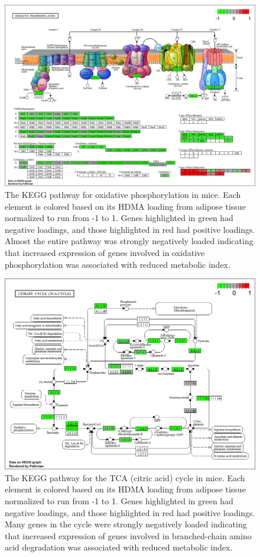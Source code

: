 \documentclass[
]{article}
\begin{document}
\begin{figure}[ht!]
\includegraphics[width=\textwidth]{Figures/Supp_Fig_OxPhos.png} 
\caption{The KEGG pathway for oxidative phosphorylation in 
mice. Each element is colored based on its HDMA loading from adipose
tissue normalized to run from -1 to 1. Genes highlighted in green had 
negative loadings, and those highlighted in red had positive loadings. 
Almost the entire pathway was strongly negatively loaded indicating 
that increased expression of genes involved in oxidative phosphorylation
was associated with reduced metabolic index.
}
\label{fig:oxPhos}
\end{figure}

\begin{figure}[ht!]
\includegraphics[width=\textwidth]{Figures/Supp_Fig_TCA.png} 
\caption{The KEGG pathway for the TCA (citric acid) cycle in 
mice. Each element is colored based on its HDMA loading from adipose
tissue normalized to run from -1 to 1. Genes highlighted in green had 
negative loadings, and those highlighted in red had positive loadings. 
Many genes in the cycle were strongly negatively loaded indicating 
that increased expression of genes involved in branched-chain amino acid 
degradation was associated with reduced metabolic index.
}
\label{fig:TCA_cycle}
\end{figure}
\end{document}
